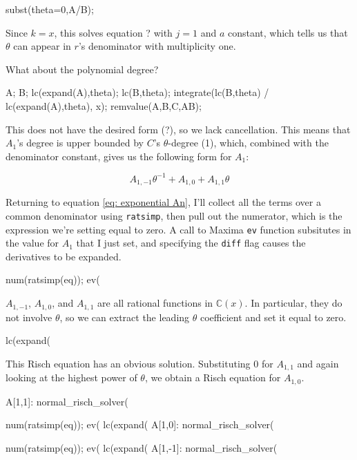 \begin{maximablock}
subst(theta=0,A/B);
\end{maximablock}

Since $k=x$, this solves equation ? with $j=1$ and $a$ constant,
which tells us that $\theta$ can appear in $r$'s denominator
with multiplicity one.

What about the polynomial degree?

\begin{maximablock}
A;
B;
lc(expand(A),theta);
lc(B,theta);
integrate(lc(B,theta) / lc(expand(A),theta), x);
remvalue(A,B,C,AB);
\end{maximablock}

This does not have the desired form (?), so we lack cancellation.
This means that $A_1$'s degree is upper bounded by
$C$'s $\theta$-degree (1), which, combined with the denominator constant,
gives us the following form for $A_1$:

$$A_{1,-1} \theta^{-1} + A_{1,0} + A_{1,1} \theta$$


Returning to equation \eqref{eq: exponential An}, I'll collect all the
terms over a common denominator using {\tt ratsimp}, then pull out the
numerator, which is the expression we're setting equal to zero.
A call to Maxima {\tt ev} function subsitutes in the value for
$A_1$ that I just set, and specifying the {\tt diff} flag causes
the derivatives to be expanded.

\begin{maximablock}
num(ratsimp(eq));
ev(%
\end{maximablock}

$A_{1,-1}$, $A_{1,0}$, and $A_{1,1}$ are all rational functions in
${\mathbb C}(x)$.  In particular, they do not involve $\theta$, so we
can extract the leading $\theta$ coefficient and set it equal to zero.

\begin{maximablock}
lc(expand(%
\end{maximablock}

This Risch equation has an obvious solution.  Substituting $0$
for $A_{1,1}$ and again looking at the highest power
of $\theta$, we obtain a Risch equation for $A_{1,0}$.

\begin{maximablock}
A[1,1]: normal_risch_solver(%

num(ratsimp(eq));
ev(%
lc(expand(%
A[1,0]: normal_risch_solver(%

num(ratsimp(eq));
ev(%
lc(expand(%
A[1,-1]: normal_risch_solver(%
\end{maximablock}

